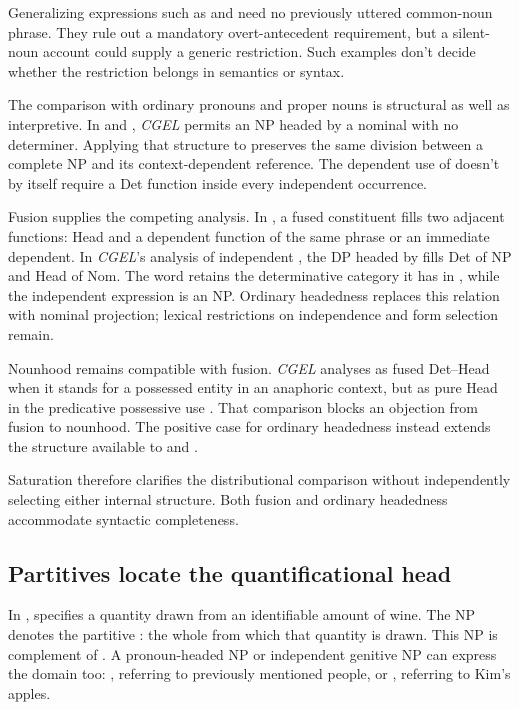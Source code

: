 \documentclass[12pt]{article}
\begin{document}
Generalizing expressions such as  and  need no previously uttered common-noun phrase. They rule out a mandatory overt-antecedent requirement, but a silent-noun account could supply a generic restriction. Such examples don't decide whether the restriction belongs in semantics or syntax.

The comparison with ordinary pronouns and proper nouns is structural as well as interpretive. In  and , \textit{CGEL} permits an NP headed by a nominal with no determiner. Applying that structure to  preserves the same division between a complete NP and its context-dependent reference. The dependent use of  doesn't by itself require a Det function inside every independent occurrence.

Fusion supplies the competing analysis. In \textcite{Payne2007}, a fused constituent fills two adjacent functions: Head and a dependent function of the same phrase or an immediate dependent. In \textit{CGEL}'s analysis of independent , the DP headed by  fills Det of NP and Head of Nom. The word retains the determinative category it has in , while the independent expression is an NP. Ordinary headedness replaces this relation with nominal projection; lexical restrictions on independence and form selection remain.

Nounhood remains compatible with fusion. \textit{CGEL} analyses  as fused Det--Head when it stands for a possessed entity in an anaphoric context, but as pure Head in the predicative possessive use  \citep[410--411]{huddleston2002}. That comparison blocks an objection from fusion to nounhood. The positive case for ordinary headedness instead extends the structure available to  and .

Saturation therefore clarifies the distributional comparison without independently selecting either internal structure. Both fusion and ordinary headedness accommodate syntactic completeness.

\subsection{Partitives locate the quantificational head}

In ,  specifies a quantity drawn from an identifiable amount of wine. The NP  denotes the partitive : the whole from which that quantity is drawn. This NP is complement of . A pronoun-headed NP or independent genitive NP can express the domain too: , referring to previously mentioned people, or , referring to Kim's apples.
\end{document}
